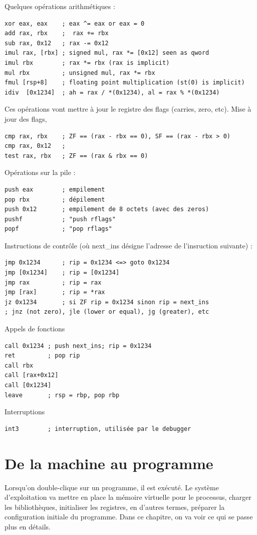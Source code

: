 \documentclass{book}
\begin{document}
Quelques opérations arithmétiques : 
\begin{verbatim}
xor eax, eax    ; eax ^= eax or eax = 0
add rax, rbx    ;  rax += rbx
sub rax, 0x12   ; rax -= 0x12
imul rax, [rbx] ; signed mul, rax *= [0x12] seen as qword 
imul rbx        ; rax *= rbx (rax is implicit) 
mul rbx         ; unsigned mul, rax *= rbx 
fmul [rsp+8]    ; floating point multiplication (st(0) is implicit)
idiv  [0x1234]  ; ah = rax / *(0x1234), al = rax % *(0x1234)
\end{verbatim}
Ces opérations vont mettre à jour le registre des flags (carries, zero, etc). Mise à jour des flags,
\begin{verbatim}
cmp rax, rbx    ; ZF == (rax - rbx == 0), SF == (rax - rbx > 0)
cmp rax, 0x12   ; 
test rax, rbx   ; ZF == (rax & rbx == 0)
\end{verbatim}


Opérations sur la pile : 
\begin{verbatim}
push eax        ; empilement
pop rbx         ; dépilement
push 0x12       ; empilement de 8 octets (avec des zeros)
pushf           ; "push rflags"
popf            ; "pop rflags"  
\end{verbatim}

Instructions de contrôle (où next\_ins désigne l'adresse de l'insruction suivante) : 
\begin{verbatim}
jmp 0x1234      ; rip = 0x1234 <=> goto 0x1234
jmp [0x1234]    ; rip = [0x1234]
jmp rax         ; rip = rax
jmp [rax]       ; rip = *rax
jz 0x1234       ; si ZF rip = 0x1234 sinon rip = next_ins
; jnz (not zero), jle (lower or equal), jg (greater), etc
\end{verbatim}

Appels de fonctions
\begin{verbatim}
call 0x1234 ; push next_ins; rip = 0x1234
ret         ; pop rip
call rbx
call [rax+0x12]
call [0x1234]
leave       ; rsp = rbp, pop rbp
\end{verbatim}

Interruptions
\begin{verbatim}
int3        ; interruption, utilisée par le debugger
\end{verbatim}

\chapter{De la machine au programme}

Lorsqu'on double-clique sur un programme, il est exécuté. Le système d'exploi\-tation va mettre en place la mémoire virtuelle pour le processus, charger les bibliothèques, initialiser les registres, en d'autres termes, préparer la configuration initiale du programme. Dans ce chapitre, on va voir ce qui se passe plus en détails. 
\end{document}
